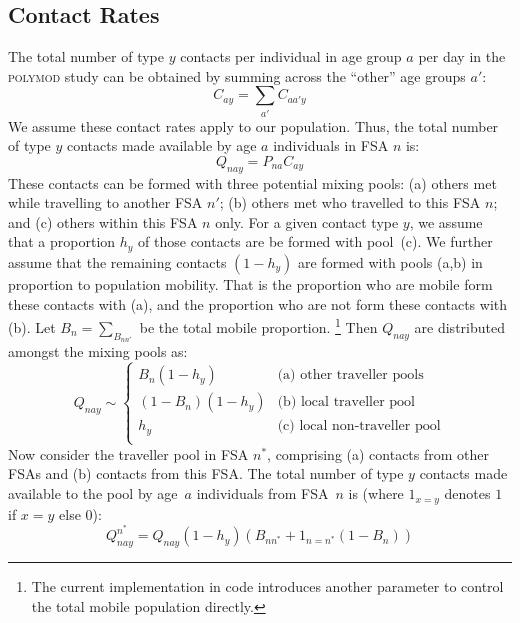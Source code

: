 \documentclass{article}
\begin{document}
  \subsection{Contact Rates}\label{ss:contacts}
  The total number of type $y$ contacts per individual in age group $a$ per day
  in the \textsc{polymod} study can be obtained by summing across the ``other'' age groups $a'$:
  \begin{equation}
    C_{ay} = \sum_{a'} C_{aa'y}
  \end{equation}
  We assume these contact rates apply to our population.
  Thus, the total number of type $y$ contacts made available by age $a$ individuals in FSA $n$ is:
  \begin{equation}
    Q_{nay} = P_{na} C_{ay}
    \label{eq:Qnay}
  \end{equation}
  These contacts can be formed with three potential mixing pools:
  (a) others met while travelling to another FSA $n'$;
  (b) others met who travelled to this FSA $n$; and
  (c) others within this FSA $n$ only.
  For a given contact type $y$, we assume that a proportion $h_y$
  of those contacts are be formed with pool~(c).
  We further assume that the remaining contacts $(1-h_y)$ are formed
  with pools (a,b) in proportion to population mobility.
  That is the proportion who are mobile form these contacts with (a),
  and the proportion who are not form these contacts with (b).
  Let $B_n = \sum_{B_{nn'}}$ be the total mobile proportion.%
  \footnote{The current implementation in code introduces another parameter
    to control the total mobile population directly.}
  Then $Q_{nay}$ are distributed amongst the mixing pools as:
  \begin{equation}
    Q_{nay} \sim
    \begin{cases}
      B_n (1-h_y)     & \textrm{(a) other traveller pools} \\
      (1-B_n) (1-h_y) & \textrm{(b) local traveller pool} \\
      h_y             & \textrm{(c) local non-traveller pool} \\
    \end{cases}
  \end{equation}
  Now consider the traveller pool in FSA $n^*$,
  comprising (a) contacts from other FSAs and (b) contacts from this FSA.
  The total number of type $y$ contacts made available to the pool
  by age~$a$ individuals from FSA~$n$ is
  (where $1_{x=y}$ denotes $1$ if $x=y$ else $0$):
  \begin{equation}
    Q^{n^*}_{nay} = Q_{nay} (1-h_y) \left(B_{nn^*} + 1_{n=n^*}(1-B_n)\right)
  \end{equation}
\end{document}
